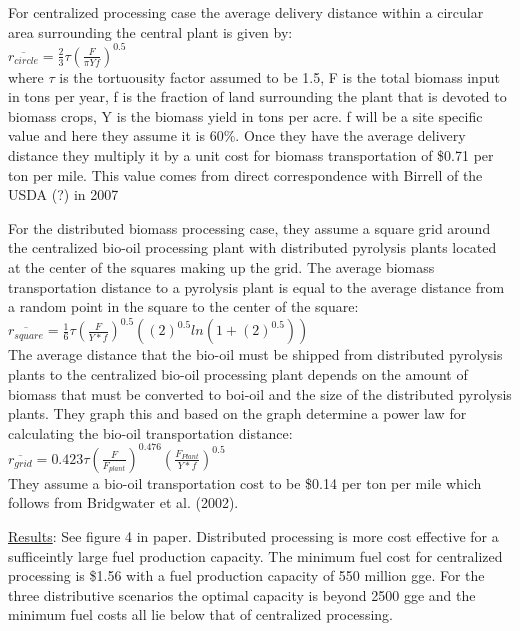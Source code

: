\documentclass{article}\usepackage[]{graphicx}\usepackage[]{color}
\begin{document}
For centralized processing case the average delivery distance within a circular area surrounding the central plant is given by: \\

$\overline{r_{circle}} = \frac{2}{3}\tau(\frac{F}{\pi Y f})^{0.5}$ \\

where $\tau$ is the tortuousity factor assumed to be 1.5, F is the total biomass input in tons per year, f is the fraction of land surrounding the plant that is devoted to biomass crops, Y is the biomass yield in tons per acre.  f will be a site specific value and here they assume it is 60\%.  Once they have the average delivery distance they multiply it by a unit cost for biomass transportation of \$0.71 per ton per mile.  This value comes from direct correspondence with Birrell of the USDA (?) in 2007

For the distributed biomass processing case, they assume a square grid around the centralized bio-oil processing plant with distributed pyrolysis plants located at the center of the squares making up the grid.  The average biomass transportation distance to a pyrolysis plant is equal to the average distance from a random point in the square to the center of the square: \\

$\overline{r_{square}} = \frac{1}{6} \tau (\frac{F}{Y*f})^{0.5} ((2)^{0.5} ln(1+(2)^{0.5}))$ \\

The average distance that the bio-oil must be shipped from distributed pyrolysis plants to the centralized bio-oil processing plant depends on the amount of biomass that must be converted to boi-oil and the size of the distributed pyrolysis plants.  They graph this and based on the graph determine a power law for calculating the bio-oil transportation distance: \\

$\overline{r_{grid}} = 0.423 \tau (\frac{F}{F_{plant}})^{0.476} (\frac{F_{Plant}}{Y*f})^{0.5}$ \\

They assume a bio-oil transportation cost to be \$0.14 per ton per mile which follows from Bridgwater et al. (2002).

\underline{Results}:  See figure 4 in paper.  Distributed processing is more cost effective for a sufficeintly large fuel production capacity.  The minimum fuel cost for centralized processing is \$1.56 with a fuel production capacity of 550 million gge.  For the three distributive scenarios the optimal capacity is beyond 2500 gge and the minimum fuel costs all lie below that of centralized processing.  
\end{document}
